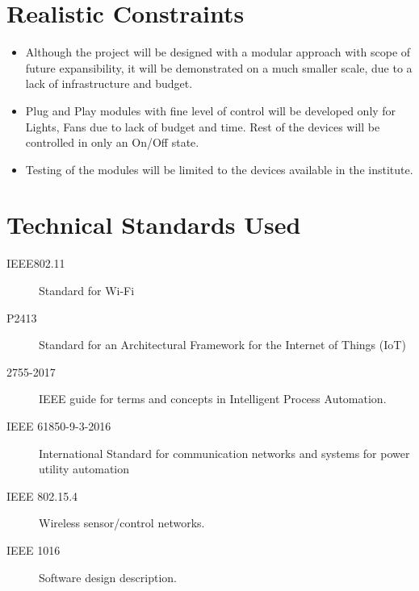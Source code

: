 \section{Realistic Constraints}
        \begin{itemize}
      \item  Although the project will be designed with a modular approach with scope of future expansibility, it will be demonstrated on a much smaller scale, due to a lack of infrastructure and budget.

		\item Plug and Play modules with fine level of control will be developed only for Lights, Fans due to lack of budget and time. Rest of the devices will be controlled in only an On/Off state.
		
		\item Testing of the modules will be limited to the devices available in the institute.
        \end{itemize}
        
        \section{Technical Standards Used}
        \begin{description}
        	\item[IEEE802.11] Standard for Wi-Fi
        	\item[P2413] Standard for an Architectural Framework for the Internet of Things (IoT)
        	\item[2755-2017]  IEEE guide for terms and concepts in Intelligent Process Automation.
			\item[IEEE 61850-9-3-2016] International Standard for communication networks and systems for power utility automation
			\item[IEEE 802.15.4] Wireless sensor/control networks.
			\item[IEEE 1016] Software design description.
        \end{description}
